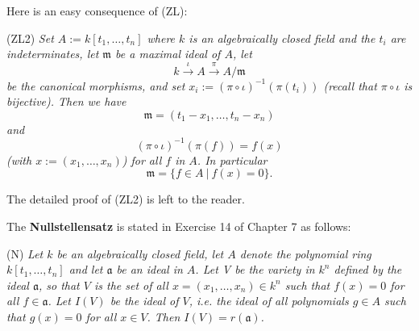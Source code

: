 \documentclass[parskip=half,fontsize=12pt]{scrartcl}%
\newcommand{\mf}{\mathfrak}
\newcommand{\aaa}{\mf a}
\newcommand{\mmm}{\mf m}
\begin{document}
Here is an easy consequence of (ZL):

(ZL2) \emph{Set $A:=k[t_1,\dots,t_n]$ where $k$ is an algebraically closed field and the $t_i$ are indeterminates, let $\mmm$ be a maximal ideal of $A$, let} 
$$
k\xrightarrow\iota A\xrightarrow{\pi}A/\mmm
$$ 
\emph{be the canonical morphisms, and set $x_i:=(\pi\circ\iota)^{-1}(\pi(t_i))$ (recall that $\pi\circ\iota$ is bijective). Then we have} 
$$
\mmm=(t_1-x_1,\dots,t_n-x_n)
$$ 
\emph{and} 
$$
(\pi\circ\iota)^{-1}(\pi(f))=f(x)
$$ 
\emph{(with $x:=(x_1,\dots,x_n)$) for all $f$ in $A$. In particular} 
$$
\mmm=\{f\in A\ |\ f(x)=0\}.
$$

The detailed proof of (ZL2) is left to the reader.

The \textbf{Nullstellensatz} is stated in Exercise 14 of Chapter 7 as follows:

(N) \emph{Let $k$ be an algebraically closed field, let $A$ denote the polynomial ring $k[t_1,\dots,t_n]$ and let $\aaa$ be an ideal in $A$. Let V be the variety in $k^n$ defined by the ideal $\aaa$, so that $V$ is the set of all $x=(x_1,\dots,x_n)\in k^n$ such that $f(x)=0$ for all $f\in\aaa$. Let $I(V)$ be the ideal of $V$, i.e. the ideal of all polynomials $g\in A$ such that $g(x)=0$ for all $x\in V$. Then $I(V)=r(\aaa)$.}
\end{document}
